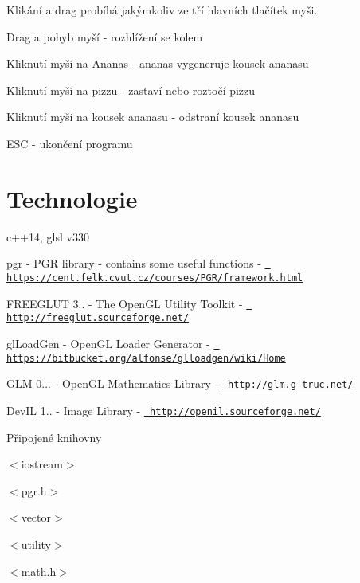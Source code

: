 Klikání a drag probíhá jakýmkoliv ze tří hlavních tlačítek myši.

Drag a pohyb myší -\/ rozhlížení se kolem

Kliknutí myší na Ananas -\/ ananas vygeneruje kousek ananasu

Kliknutí myší na pizzu -\/ zastaví nebo roztočí pizzu

Kliknutí myší na kousek ananasu -\/ odstraní kousek ananasu

E\+SC -\/ ukončení programu\hypertarget{index_Technologie}{}\section{Technologie}\label{index_Technologie}
c++14, glsl v330

pgr -\/ P\+GR library -\/ contains some useful functions -\/ \href{https://cent.felk.cvut.cz/courses/PGR/framework.html}{\texttt{ https\+://cent.\+felk.\+cvut.\+cz/courses/\+P\+G\+R/framework.\+html}}

F\+R\+E\+E\+G\+L\+UT 3.. -\/ The Open\+GL Utility Toolkit -\/ \href{http://freeglut.sourceforge.net/}{\texttt{ http\+://freeglut.\+sourceforge.\+net/}}

gl\+Load\+Gen -\/ Open\+GL Loader Generator -\/ \href{https://bitbucket.org/alfonse/glloadgen/wiki/Home}{\texttt{ https\+://bitbucket.\+org/alfonse/glloadgen/wiki/\+Home}}

G\+LM 0... -\/ Open\+GL Mathematics Library -\/ \href{http://glm.g-truc.net/}{\texttt{ http\+://glm.\+g-\/truc.\+net/}}

Dev\+IL 1.. -\/ Image Library -\/ \href{http://openil.sourceforge.net/}{\texttt{ http\+://openil.\+sourceforge.\+net/}}

Připojené knihovny

$<$iostream$>$

$<$pgr.\+h$>$

$<$vector$>$

$<$utility$>$

$<$math.\+h$>$ 